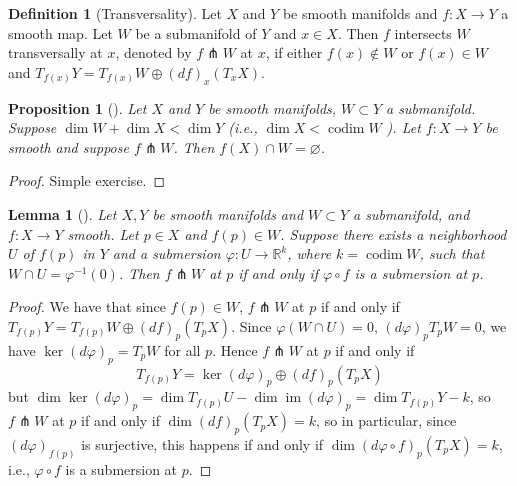 \documentclass[reqno]{amsart}
\newtheorem{lemma}[theorem]{Lemma}
\newtheorem{proposition}[theorem]{Proposition}
\theoremstyle{definition}
\newtheorem{definition}[theorem]{Definition}
\theoremstyle{remark}
\DeclareMathOperator{\im}{im}
\DeclareMathOperator{\codim}{codim}
\begin{document}
\begin{definition}[Transversality]
    Let $X$ and $Y$ be smooth manifolds and
    $f \colon X \to Y$ a smooth map. Let
    $W$ be a submanifold of $Y$ and
    $x \in X$. Then $f$ intersects $W$ transversally
    at $x$, denoted by
    $f \pitchfork W $ at $x$, if either
    $f(x) \not\in W$ or
    $f(x) \in W$ and
    $T_{f(x)}Y = T_{f(x)} W \oplus
    \left( df \right)_x \left( T_x X \right) $.
\end{definition}

\begin{proposition}[]\label{Transversality-Dimensions}
    Let $X$ and $Y$ be smooth manifolds,
    $W \subset Y$ a submanifold. 
    Suppose $\dim W + \dim X < \dim Y$ (i.e.,
    $\dim X < \codim W$ ). Let
    $f \colon X \to Y$ be smooth and suppose 
    $f \pitchfork W$. Then
    $f(X) \cap W = \varnothing$.
\end{proposition}

\begin{proof}
    Simple exercise.
\end{proof}

\begin{lemma}[]\label{Transversality-Submersion}
    Let $X,Y$ be smooth manifolds and
    $W \subset Y$ a submanifold, and
    $f \colon X \to Y$ smooth. Let
    $p \in X$ and $f(p) \in W$. Suppose there
    exists a neighborhood $U$ of $f(p)$ in
    $Y$ and a submersion $\varphi \colon
    U \to \mathbb{R}^{k}$, where
    $k = \codim W$, such that
    $W \cap U = \varphi^{-1}(0)$. Then
    $f \pitchfork W$ at $p$ if and only if
    $\varphi \circ f$ is a submersion at $p$.
\end{lemma}

\begin{proof}
    We have that since
    $f(p) \in W$,
    $f \pitchfork W$ at $p$ if and only if
    $T_{f(p)} Y = T_{f(p)} W \oplus
    (df)_p \left( T_p X \right) $.
    Since
    $\varphi \left( W \cap U \right) 
    = 0$,
    $(d \varphi)_p T_pW = 0$, we have
    $\ker \left( d \varphi  \right)_p
    = T_p W$ for all $ p$.
    Hence $f \pitchfork W$ at $p$ if and only if
    \[
        T_{f(p)} Y =
        \ker \left( d \varphi  \right)_p 
        \oplus \left( df \right)_p \left( T_pX \right) 
    \] 
    but
    $\dim \ker \left( d \varphi  \right)_p 
    = \dim T_{f(p)} U - \dim
    \im \left( d \varphi  \right)_p
    = \dim T_{f(p)} Y - k$, so
    $f \pitchfork W$ at $p$ if and only if
    $\dim \left( df \right)_p \left( T_p X \right) 
    = k$, so in particular,
    since $\left( d \varphi  \right)_{f(p)}$ is surjective,
    this happens if and only if
    $\dim \left( d \varphi \circ f \right)_p 
    \left( T_p X \right) = k$, i.e., 
    $\varphi \circ f$ is a submersion at $p$.




\end{proof}
\end{document}
